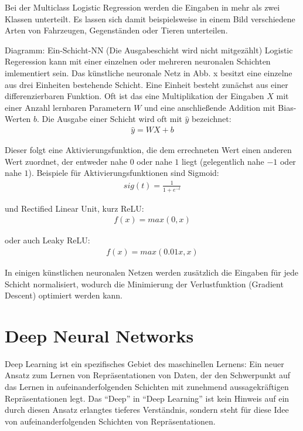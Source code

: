 Bei der Multiclass Logistic Regression werden die Eingaben in mehr als zwei Klassen unterteilt. Es lassen sich damit beispielsweise in einem Bild  verschiedene Arten von Fahrzeugen, Gegenständen oder Tieren unterteilen.

Diagramm: Ein-Schicht-NN (Die Ausgabeschicht wird nicht mitgezählt) Logistic Regeression kann mit einer einzelnen oder mehreren neuronalen Schichten imlementiert sein. Das künstliche neuronale Netz in Abb. x besitzt eine einzelne aus drei Einheiten bestehende Schicht. Eine Einheit besteht zunächst aus einer differenzierbaren Funktion. Oft ist das eine Multiplikation der Eingaben $X$ mit einer Anzahl lernbaren Parametern $W$ und eine anschließende Addition mit Bias-Werten $b$. Die Ausgabe einer Schicht wird oft mit $\hat{y}$ bezeichnet:
\begin{align}
\hat{y} = WX+b
\end{align}

Dieser folgt eine Aktivierungsfunktion, die dem errechneten Wert einen anderen Wert zuordnet, der entweder nahe $0$ oder nahe $1$ liegt (gelegentlich nahe $-1$ oder nahe $1$). Beispiele für Aktivierungsfunktionen sind Sigmoid:
\begin{align}
sig(t) = \frac{1}{1+e^{-t}}
\end{align}

und Rectified Linear Unit, kurz ReLU:
\begin{align}
f(x) = max(0, x)
\end{align}

oder auch Leaky ReLU:
\begin{align}
f(x) = max(0.01x, x)
\end{align}

In einigen künstlichen neuronalen Netzen werden zusätzlich die Eingaben für jede Schicht normalisiert, wodurch die Minimierung der Verlustfunktion (Gradient Descent) optimiert werden kann.

\section{Deep Neural Networks}
\label{sec:dnn}
Deep Learning ist ein spezifisches Gebiet des maschinellen Lernens: Ein neuer Ansatz zum Lernen von Repräsentationen von Daten, der den Schwerpunkt auf das Lernen in aufeinanderfolgenden Schichten mit zunehmend aussagekräftigen Repräsentationen legt. Das ``Deep'' in ``Deep Learning'' ist kein Hinweis auf ein durch diesen Ansatz erlangtes tieferes Verständnis, sondern steht für diese Idee von aufeinanderfolgenden Schichten von Repräsentationen.

